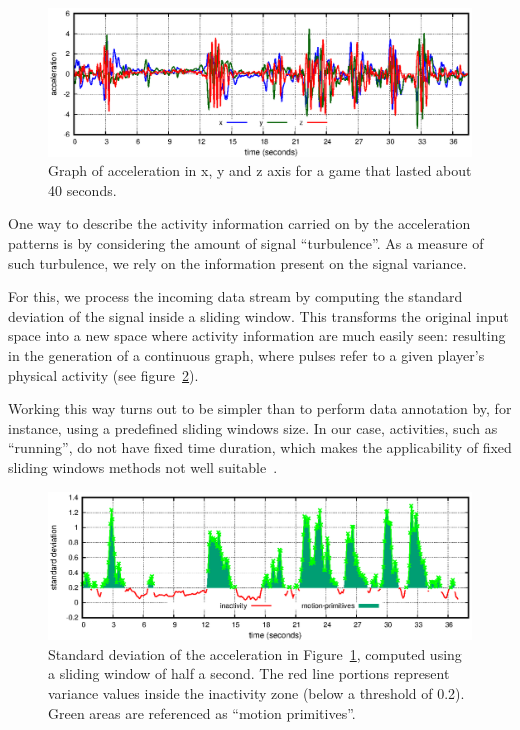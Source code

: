 \begin{figure}[h!]
      \centering
      \includegraphics[width=\linewidth]{images/04-activity/newGraph.eps}
      \caption{Graph of acceleration in x, y and z axis for a game that lasted about 40 seconds.}
      \label{acc_graph}
\end{figure}

One way to describe the activity information carried on by the acceleration patterns is by considering the amount of signal ``turbulence''. As a measure of such turbulence, we rely on the information present on the signal variance. 

For this, we process the incoming data stream by computing the standard deviation of the signal inside a sliding window. This transforms the original input space into a new space where activity information are much easily seen: resulting in the generation of a continuous graph, where pulses refer to a given player's physical activity (see figure~\ref{std_graph}). %

Working this way turns out to be simpler than to perform data annotation by, for instance, using a predefined sliding windows size. In our case, activities, such as ``running'', do not have fixed time duration, which makes the applicability of fixed sliding windows methods not well suitable~\cite{noor_adaptive_2016}.

\begin{figure}[thpb]
      \centering
      \includegraphics[width=\linewidth]{images/04-activity/newStdGraph.eps}
      \caption{Standard deviation of the acceleration in Figure~\ref{acc_graph}, computed using a sliding window of half a second. The red line portions represent variance values inside the inactivity zone (below a threshold of 0.2). Green areas are referenced as ``motion primitives''.}
      \label{std_graph}
\end{figure}


